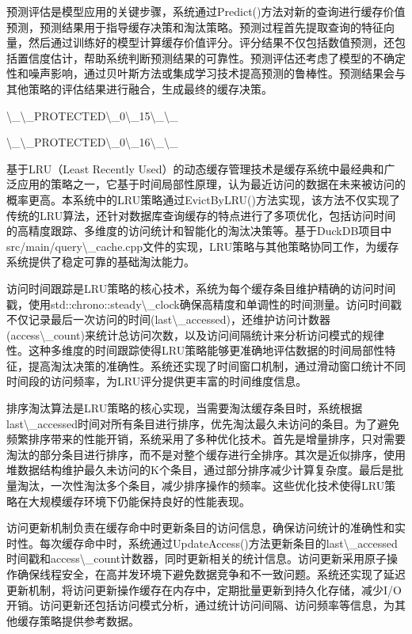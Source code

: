 预测评估是模型应用的关键步骤，系统通过Predict()方法对新的查询进行缓存价值预测，预测结果用于指导缓存决策和淘汰策略。预测过程首先提取查询的特征向量，然后通过训练好的模型计算缓存价值评分。评分结果不仅包括数值预测，还包括置信度估计，帮助系统判断预测结果的可靠性。预测评估还考虑了模型的不确定性和噪声影响，通过贝叶斯方法或集成学习技术提高预测的鲁棒性。预测结果会与其他策略的评估结果进行融合，生成最终的缓存决策。

\textbackslash{}_\textbackslash{}_PROTECTED\textbackslash{}_0\textbackslash{}_15\textbackslash{}_\textbackslash{}_

\textbackslash{}_\textbackslash{}_PROTECTED\textbackslash{}_0\textbackslash{}_16\textbackslash{}_\textbackslash{}_

基于LRU（Least Recently Used）的动态缓存管理技术是缓存系统中最经典和广泛应用的策略之一，它基于时间局部性原理，认为最近访问的数据在未来被访问的概率更高。本系统中的LRU策略通过EvictByLRU()方法实现，该方法不仅实现了传统的LRU算法，还针对数据库查询缓存的特点进行了多项优化，包括访问时间的高精度跟踪、多维度的访问统计和智能化的淘汰决策等。基于DuckDB项目中src/main/query\textbackslash{}_cache.cpp文件的实现，LRU策略与其他策略协同工作，为缓存系统提供了稳定可靠的基础淘汰能力。

访问时间跟踪是LRU策略的核心技术，系统为每个缓存条目维护精确的访问时间戳，使用std::chrono::steady\textbackslash{}_clock确保高精度和单调性的时间测量。访问时间戳不仅记录最后一次访问的时间(last\textbackslash{}_accessed)，还维护访问计数器(access\textbackslash{}_count)来统计总访问次数，以及访问间隔统计来分析访问模式的规律性。这种多维度的时间跟踪使得LRU策略能够更准确地评估数据的时间局部性特征，提高淘汰决策的准确性。系统还实现了时间窗口机制，通过滑动窗口统计不同时间段的访问频率，为LRU评分提供更丰富的时间维度信息。

排序淘汰算法是LRU策略的核心实现，当需要淘汰缓存条目时，系统根据last\textbackslash{}_accessed时间对所有条目进行排序，优先淘汰最久未访问的条目。为了避免频繁排序带来的性能开销，系统采用了多种优化技术。首先是增量排序，只对需要淘汰的部分条目进行排序，而不是对整个缓存进行全排序。其次是近似排序，使用堆数据结构维护最久未访问的K个条目，通过部分排序减少计算复杂度。最后是批量淘汰，一次性淘汰多个条目，减少排序操作的频率。这些优化技术使得LRU策略在大规模缓存环境下仍能保持良好的性能表现。

访问更新机制负责在缓存命中时更新条目的访问信息，确保访问统计的准确性和实时性。每次缓存命中时，系统通过UpdateAccess()方法更新条目的last\textbackslash{}_accessed时间戳和access\textbackslash{}_count计数器，同时更新相关的统计信息。访问更新采用原子操作确保线程安全，在高并发环境下避免数据竞争和不一致问题。系统还实现了延迟更新机制，将访问更新操作缓存在内存中，定期批量更新到持久化存储，减少I/O开销。访问更新还包括访问模式分析，通过统计访问间隔、访问频率等信息，为其他缓存策略提供参考数据。

